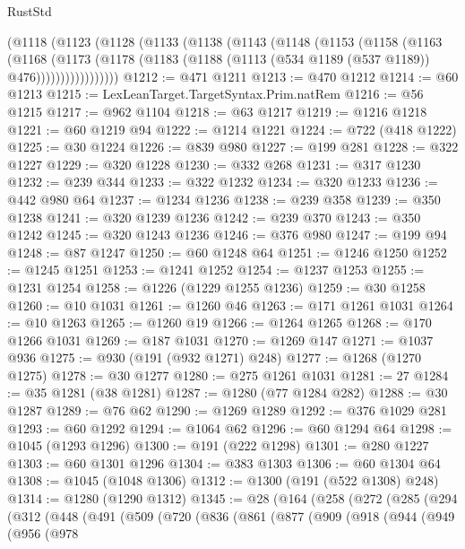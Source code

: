 \begin{lexlean}{RustStd}
\begin{coremodule}
{\begin{coremodule}
{{{{{{{{{{{{{{{{{{{{{{{{{{{{{{{{      (@1118
        (@1123
          (@1128
            (@1133
              (@1138
                (@1143
                  (@1148
                    (@1153
                      (@1158
                        (@1163
                          (@1168
                            (@1173
                              (@1178
                                (@1183 (@1188 (@1113 (@534 @1189 (@537 @1189)) @476)))))))))))))))))
@1212 := @471 @1211
@1213 := @470 @1212
@1214 := @60 @1213
@1215 := LexLeanTarget.TargetSyntax.Prim.natRem
@1216 := @56 @1215
@1217 := @962 @1104
@1218 := @63 @1217
@1219 := @1216 @1218
@1221 := @60 @1219 @94
@1222 := @1214 @1221
@1224 := @722 (@418 @1222)
@1225 := @30 @1224
@1226 := @839 @980
@1227 := @199 @281
@1228 := @322 @1227
@1229 := @320 @1228
@1230 := @332 @268
@1231 := @317 @1230
@1232 := @239 @344
@1233 := @322 @1232
@1234 := @320 @1233
@1236 := @442 @980 @64
@1237 := @1234 @1236
@1238 := @239 @358
@1239 := @350 @1238
@1241 := @320 @1239 @1236
@1242 := @239 @370
@1243 := @350 @1242
@1245 := @320 @1243 @1236
@1246 := @376 @980
@1247 := @199 @94
@1248 := @87 @1247
@1250 := @60 @1248 @64
@1251 := @1246 @1250
@1252 := @1245 @1251
@1253 := @1241 @1252
@1254 := @1237 @1253
@1255 := @1231 @1254
@1258 := @1226 (@1229 @1255 @1236)
@1259 := @30 @1258
@1260 := @10 @1031
@1261 := @1260 @46
@1263 := @171 @1261 @1031
@1264 := @10 @1263
@1265 := @1260 @19
@1266 := @1264 @1265
@1268 := @170 @1266 @1031
@1269 := @187 @1031
@1270 := @1269 @147
@1271 := @1037 @936
@1275 := @930 (@191 (@932 @1271) @248)
@1277 := @1268 (@1270 @1275)
@1278 := @30 @1277
@1280 := @275 @1261 @1031
@1281 := 27
@1284 := @35 @1281 (@38 @1281)
@1287 := @1280 (@77 @1284 @282)
@1288 := @30 @1287
@1289 := @76 @62
@1290 := @1269 @1289
@1292 := @376 @1029 @281
@1293 := @60 @1292
@1294 := @1064 @62
@1296 := @60 @1294 @64
@1298 := @1045 (@1293 @1296)
@1300 := @191 (@222 @1298)
@1301 := @280 @1227
@1303 := @60 @1301 @1296
@1304 := @383 @1303
@1306 := @60 @1304 @64
@1308 := @1045 (@1048 @1306)
@1312 := @1300 (@191 (@522 @1308) @248)
@1314 := @1280 (@1290 @1312)
@1345 := @28
    (@164
      (@258
        (@272
          (@285
            (@294
              (@312
                (@448
                  (@491
                    (@509
                      (@720
                        (@836
                          (@861
                            (@877
                              (@909
                                (@918
                                  (@944
                                    (@949
                                      (@956
                                        (@978
}}}}}}}}}}}}}}}}}}}}}}}}}}}}}}}}
\end{coremodule}}
\end{coremodule}
\end{lexlean}

